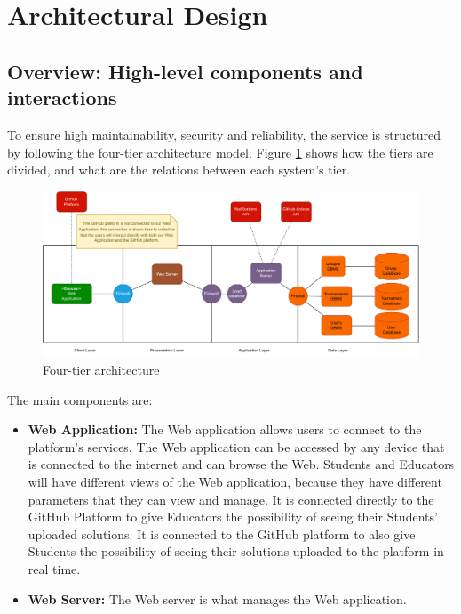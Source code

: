 \documentclass{article}
\begin{document}
{\newpage
\pagestyle{ArchitecturalDesignStyle}

\section{Architectural Design}
    \subsection{Overview: High-level components and interactions}
    To ensure high maintainability, security and reliability, the service is structured by following 
    the four-tier architecture model.
    Figure \ref{fig:fourTierArchitecture} shows how the tiers are divided, and what are the relations between 
    each system's tier.
    \begin{figure}[H]
        \centering
        \includegraphics[scale=0.5]{images/FourTierApplication.pdf}
        \caption{Four-tier architecture}
        \label{fig:fourTierArchitecture}
    \end{figure}
    \noindent
    The main components are:
    \begin{itemize}
        \item \textbf{Web Application:} The Web application allows users to connect to the platform's 
        services. The Web application can be accessed by any device that is connected to the internet 
        and can browse the Web. Students and Educators will have different views of the Web application, 
        because they have different parameters that they can view and manage.
        It is connected directly to the GitHub Platform to give Educators the possibility of seeing their Students' 
        uploaded solutions. It is connected to the GitHub platform to also give Students the possibility 
        of seeing their solutions uploaded to the platform in real time.\\
        \item \textbf{Web Server:} The Web server is what manages the Web application. 

\end{itemize}}
\end{document}
